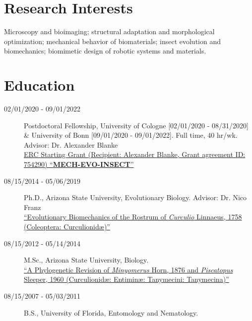 \documentclass[12pt,a4paper]{article}
\begin{document}
\section*{Research Interests}
	Microscopy and bioimaging;
	structural adaptation and morphological optimization;
	mechanical behavior of biomaterials;
	insect evolution and biomechanics;
	biomimetic design of robotic systems and materials.

\section*{Education}
	\begin{description}
		\item [02/01/2020 - 09/01/2022] Postdoctoral Fellowship, University of Cologne [02/01/2020 - 08/31/2020] \& University of Bonn [09/01/2020 - 09/01/2022]. Full time, 40 hr/wk. Advisor: Dr. Alexander Blanke
		\\ \href{https://cordis.europa.eu/project/id/754290}{ERC Starting Grant (Recipient: Alexander Blanke, Grant agreement ID: 754290) ``\textbf{MECH-EVO-INSECT}''}
		\item [08/15/2014 - 05/06/2019] Ph.D., Arizona State University, Evolutionary Biology. Advisor: Dr. Nico Franz
		\\ \href{https://repository.asu.edu/items/53836}{``Evolutionary Biomechanics of the Rostrum of \textit{Curculio} Linnaeus, 1758
		(Coleoptera: Curculionid\ae)''}
		\item [08/15/2012 - 05/14/2014] M.Sc., Arizona State University, Biology.
		\\ \href{https://repository.asu.edu/items/25115}{``A Phylogenetic Revision of \textit{Minyomerus} Horn, 1876 and \textit{Piscatopus} Sleeper, 1960
		(Curculionid\ae: Entimin\ae: Tanymecini: Tanymecina)''}
		\item [08/15/2007 - 05/03/2011] B.S., University of Florida, Entomology and Nematology.
	\end{description}
\end{document}

